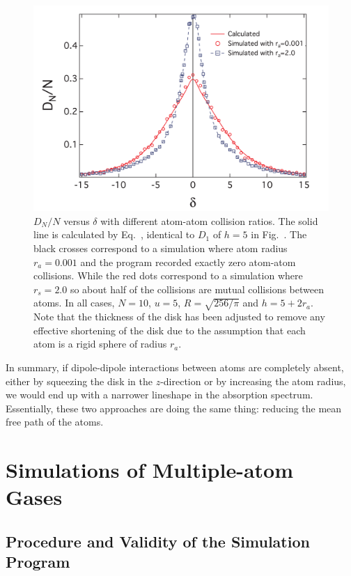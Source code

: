 \begin{figure}[h!]
\begin{center}
\includegraphics[width=\textwidth]{COLLISION.pdf}
\end{center}
\caption{$D_N/N$ versus $\delta$ with different atom-atom collision ratios. The solid line is calculated by Eq.~, identical to $D_1$ of $h=5$ in Fig.~. The black crosses correspond to a simulation where atom radius $r_a=0.001$ and the program recorded exactly zero atom-atom collisions. While the red dots correspond to a simulation where $r_s=2.0$ so about half of the collisions are mutual collisions between atoms. In all cases, $N=10$, $u=5$, $R=\sqrt{256/\pi}$ and $h=5+2r_a$. Note that the thickness of the disk has been adjusted to remove any effective shortening of the disk due to the assumption that each atom is a rigid sphere of radius $r_a$.}
\label{COLLISION}
\end{figure}
In summary, if dipole-dipole interactions between atoms are completely absent, either by squeezing the disk in the $z$-direction or by increasing the atom radius, we would end up with a narrower lineshape in the absorption spectrum. Essentially, these two approaches are doing the same thing: reducing the mean free path of the atoms.

\section{Simulations of Multiple-atom Gases}

\subsection{Procedure and Validity of the Simulation Program}

